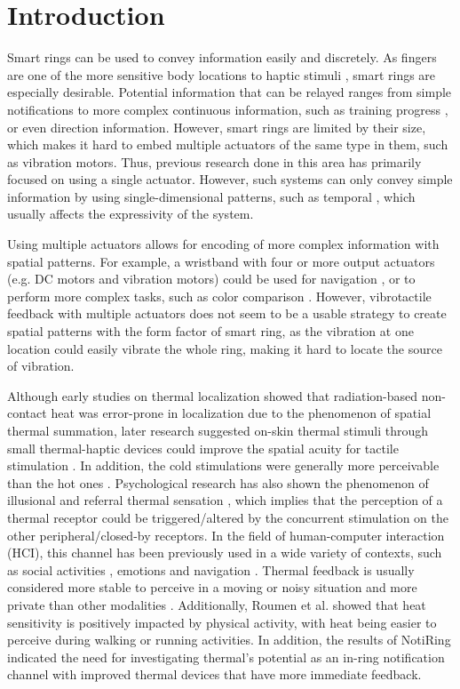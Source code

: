 \documentclass[preprint,12pt]{elsarticle}
\begin{document}

\section{Introduction}
Smart rings can be used to convey information easily and discretely. As fingers are one of the more sensitive body locations to haptic stimuli \cite{16}, smart rings are especially desirable. Potential information that can be relayed ranges from simple notifications to more complex continuous information, such as training progress \cite{3}, or even direction information. However, smart rings are limited by their size, which makes it hard to embed multiple actuators of the same type in them, such as vibration motors. Thus, previous research done in this area \cite{12,22} has primarily focused on using a single actuator. However, such systems can only convey simple information by using single-dimensional patterns, such as temporal \cite{25}, which usually affects the expressivity of the system.

Using multiple actuators allows for encoding of more complex information with spatial patterns. For example, a wristband with four or more output actuators (e.g. DC motors and vibration motors) could be used for navigation \cite{34}, or to perform more complex tasks, such as color comparison \cite{2}. However, vibrotactile feedback with multiple actuators does not seem to be a usable strategy to create spatial patterns with the form factor of smart ring, as the vibration at one location could easily vibrate the whole ring, making it hard to locate the source of vibration.

Although early studies \cite{26,27,31} on thermal localization showed that radiation-based non-contact heat was error-prone in localization due to the phenomenon of spatial thermal summation, later research suggested on-skin thermal stimuli through small thermal-haptic devices could improve the spatial acuity for tactile stimulation \cite{28}. In addition, the cold stimulations were generally more perceivable than the hot ones \cite{42}. Psychological research has also shown the phenomenon of illusional and referral thermal sensation \cite{6}, which implies that the perception of a thermal receptor could be triggered/altered by the concurrent stimulation on the other peripheral/closed-by receptors. In the field of human-computer interaction (HCI), this channel has been previously used in a wide variety of contexts, such as social activities \cite{40}, emotions \cite{35,37,41} and navigation \cite{34}. Thermal feedback is usually considered more stable to perceive in a moving or noisy situation and  more private than other modalities \cite{10}. Additionally, Roumen et al. \cite{24} showed that heat sensitivity is positively impacted by physical activity, with heat being easier to perceive during walking or running activities. In addition, the results of NotiRing indicated the need for investigating thermal's potential as an in-ring notification channel with improved thermal devices that have more immediate feedback.
\end{document}
